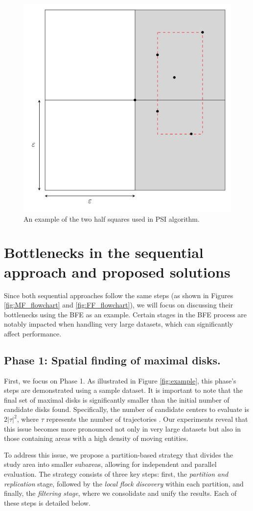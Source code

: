\begin{figure}
    \centering
    \includegraphics[width=0.5\linewidth]{figures/square.pdf}
    \caption{An example of the two half squares used in PSI algorithm.}\label{fig:square}
\end{figure}

\section{Bottlenecks in the sequential approach and proposed solutions} \label{spatial_phase}
Since both sequential approaches follow the same steps (as shown in Figures \ref{fig:MF_flowchart} and \ref{fig:FF_flowchart}), we will focus on discussing their bottlenecks using the BFE as an example. Certain stages in the BFE process are notably impacted when handling very large datasets, which can significantly affect performance.

\subsection{Phase 1: Spatial finding of maximal disks.}
First, we focus on Phase 1. As illustrated in Figure \ref{fig:example}, this phase's steps are demonstrated using a sample dataset. It is important to note that 
the final set of maximal disks is significantly smaller than the initial number of candidate disks found. Specifically, the number of candidate centers to 
evaluate is $2\lvert\tau\rvert^2$, where $\tau$ represents the number of trajectories \cite{vieira_-line_2009}. Our experiments reveal that this issue becomes 
more pronounced not only in very large datasets but also in those containing areas with a high density of moving entities.

To address this issue, we propose a partition-based strategy that divides the study area into smaller subareas, allowing for independent and parallel evaluation. The strategy consists of three key steps: first, the \textit{partition and replication} stage, followed by the \textit{local flock discovery} within each partition, and finally, the \textit{filtering stage}, where we consolidate and unify the results. Each of these steps is detailed below.


